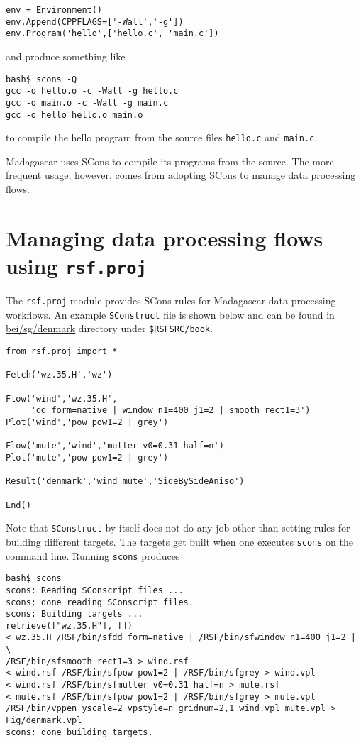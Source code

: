 \begin{lstlisting}
env = Environment()
env.Append(CPPFLAGS=['-Wall','-g'])
env.Program('hello',['hello.c', 'main.c'])
\end{lstlisting}

and produce something like

\begin{verbatim}
bash$ scons -Q
gcc -o hello.o -c -Wall -g hello.c
gcc -o main.o -c -Wall -g main.c
gcc -o hello hello.o main.o
\end{verbatim}
to compile the hello program from the source files \texttt{hello.c} and \texttt{main.c}.

Madagascar uses SCons to compile its programs from the source. The more frequent usage, however, comes from adopting SCons to manage data processing flows.

\section{Managing data processing flows using \texttt{rsf.proj}}

The \texttt{rsf.proj} module provides SCons rules for Madagascar data processing workflows. An example \texttt{SConstruct} file is shown below and can be found in \href{http://ahay.org/RSF/book/bei/sg/denmark.html}{bei/sg/denmark} directory under \texttt{\$RSFSRC/book}.

\begin{lstlisting}
from rsf.proj import *

Fetch('wz.35.H','wz')

Flow('wind','wz.35.H',
     'dd form=native | window n1=400 j1=2 | smooth rect1=3')
Plot('wind','pow pow1=2 | grey')

Flow('mute','wind','mutter v0=0.31 half=n')
Plot('mute','pow pow1=2 | grey')

Result('denmark','wind mute','SideBySideAniso')

End()
\end{lstlisting}

Note that \texttt{SConstruct} by itself does not do any job other than setting rules for building different targets. The targets get built when one executes \texttt{scons} on the command line. Running \texttt{scons} produces

\begin{verbatim}
bash$ scons
scons: Reading SConscript files ...
scons: done reading SConscript files.
scons: Building targets ...
retrieve(["wz.35.H"], [])
< wz.35.H /RSF/bin/sfdd form=native | /RSF/bin/sfwindow n1=400 j1=2 | \
/RSF/bin/sfsmooth rect1=3 > wind.rsf
< wind.rsf /RSF/bin/sfpow pow1=2 | /RSF/bin/sfgrey > wind.vpl
< wind.rsf /RSF/bin/sfmutter v0=0.31 half=n > mute.rsf
< mute.rsf /RSF/bin/sfpow pow1=2 | /RSF/bin/sfgrey > mute.vpl
/RSF/bin/vppen yscale=2 vpstyle=n gridnum=2,1 wind.vpl mute.vpl > Fig/denmark.vpl
scons: done building targets.
\end{verbatim}

